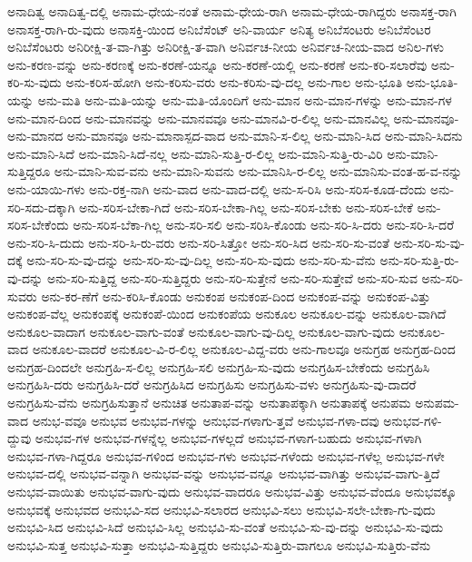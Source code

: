 {ಅನಾದಿತ್ವ
ಅನಾದಿತ್ವ-ದಲ್ಲಿ
ಅನಾಮ-ಧೇಯ-ನಂತೆ
ಅನಾಮ-ಧೇಯ-ರಾಗಿ
ಅನಾಮ-ಧೇಯ-ರಾಗಿದ್ದರು
ಅನಾಸಕ್ತ-ರಾಗಿ
ಅನಾಸಕ್ತ-ರಾಗಿ-ರು-ವುದು
ಅನಾಸಕ್ತಿ-ಯಿಂದ
ಅನಿಬೆಸೆಂಟ್
ಅನಿ-ವಾರ್ಯ
ಅನಿತ್ಯ
ಅನಿಬೆಸಂಟರು
ಅನಿಬೆಸೆಂಟರ
ಅನಿಬೆಸೆಂಟರು
ಅನಿರೀಕ್ಷಿ-ತ-ವಾ-ಗಿತ್ತು
ಅನಿರೀಕ್ಷಿ-ತ-ವಾಗಿ
ಅನಿರ್ವಚ-ನೀಯ
ಅನಿರ್ವಚ-ನೀಯ-ವಾದ
ಅನಿಲ-ಗಳು
ಅನು-ಕರಣ-ವನ್ನು
ಅನು-ಕರಣಕ್ಕೆ
ಅನು-ಕರಣೆ-ಯನ್ನೂ
ಅನು-ಕರಣೆ-ಯಲ್ಲಿ
ಅನು-ಕರಣೆ
ಅನು-ಕರಿ-ಸಲಾರೆವು
ಅನು-ಕರಿ-ಸು-ವುದು
ಅನು-ಕರಿಸ-ಹೋಗಿ
ಅನು-ಕರಿಸು-ವರು
ಅನು-ಕರಿಸು-ವು-ದಲ್ಲ
ಅನು-ಗಾಲ
ಅನು-ಭೂತಿ
ಅನು-ಭೂತಿ-ಯನ್ನು
ಅನು-ಮತಿ
ಅನು-ಮತಿ-ಯನ್ನು
ಅನು-ಮತಿ-ಯೊಂದಿಗೆ
ಅನು-ಮಾನ
ಅನು-ಮಾನ-ಗಳನ್ನು
ಅನು-ಮಾನ-ಗಳ
ಅನು-ಮಾನ-ದಿಂದ
ಅನು-ಮಾನವನ್ನು
ಅನು-ಮಾನವವೂ
ಅನು-ಮಾನವಿ-ರ-ಲಿಲ್ಲ
ಅನು-ಮಾನವಿಲ್ಲ
ಅನು-ಮಾನವೂ-
ಅನು-ಮಾನದ
ಅನು-ಮಾನವೂ
ಅನು-ಮಾನಾಸ್ಪದ-ವಾದ
ಅನು-ಮಾನಿ-ಸ-ಲಿಲ್ಲ
ಅನು-ಮಾನಿ-ಸಿದ
ಅನು-ಮಾನಿ-ಸಿದನು
ಅನು-ಮಾನಿ-ಸಿದೆ
ಅನು-ಮಾನಿ-ಸಿದೆ-ನಲ್ಲ
ಅನು-ಮಾನಿ-ಸುತ್ತಿ-ರ-ಲಿಲ್ಲ
ಅನು-ಮಾನಿ-ಸುತ್ತಿ-ರು-ವಿರಿ
ಅನು-ಮಾನಿ-ಸುತ್ತಿದ್ದರೂ
ಅನು-ಮಾನಿ-ಸುವ-ವನು
ಅನು-ಮಾನಿ-ಸುವನು
ಅನು-ಮಾನಿಸಿ-ರ-ಲಿಲ್ಲ
ಅನು-ಮಾನಿಸು-ವಂತ-ಹ-ವ-ನನ್ನು
ಅನು-ಯಾಯಿ-ಗಳು
ಅನು-ರಕ್ತ-ನಾಗಿ
ಅನು-ವಾದ
ಅನು-ವಾದ-ದಲ್ಲಿ
ಅನು-ಸ-ರಿಸಿ
ಅನು-ಸರಿಸ-ಕೂಡ-ದೆಂದು
ಅನು-ಸರಿ-ಸದು-ದಕ್ಕಾಗಿ
ಅನು-ಸರಿಸ-ಬೇಕಾ-ಗಿದೆ
ಅನು-ಸರಿಸ-ಬೇಕಾ-ಗಿಲ್ಲ
ಅನು-ಸರಿಸ-ಬೇಕು
ಅನು-ಸರಿಸ-ಬೇಕೆ
ಅನು-ಸರಿಸ-ಬೇಕೆಂದು
ಅನು-ಸರಿಸ-ಬೆಕಾ-ಗಿಲ್ಲ
ಅನು-ಸರಿ-ಸಲಿ
ಅನು-ಸರಿಸಿ-ಕೊಂಡು
ಅನು-ಸರಿ-ಸಿ-ದರು
ಅನು-ಸರಿ-ಸಿ-ದರೆ
ಅನು-ಸರಿ-ಸಿ-ದುದು
ಅನು-ಸರಿ-ಸಿ-ರು-ವರು
ಅನು-ಸರಿ-ಸಿತ್ತೋ
ಅನು-ಸರಿ-ಸಿದ
ಅನು-ಸರಿ-ಸು-ವಂತೆ
ಅನು-ಸರಿ-ಸು-ವು-ದಕ್ಕೆ
ಅನು-ಸರಿ-ಸು-ವು-ದನ್ನು
ಅನು-ಸರಿ-ಸು-ವು-ದಿಲ್ಲ
ಅನು-ಸರಿ-ಸು-ವುದು
ಅನು-ಸರಿ-ಸು-ವೆನು
ಅನು-ಸರಿ-ಸುತ್ತಿ-ರು-ವು-ದನ್ನು
ಅನು-ಸರಿ-ಸುತ್ತಿದ್ದ
ಅನು-ಸರಿ-ಸುತ್ತಿದ್ದರು
ಅನು-ಸರಿ-ಸುತ್ತೇನೆ
ಅನು-ಸರಿ-ಸುತ್ತೇವೆ
ಅನು-ಸರಿ-ಸುವ
ಅನು-ಸರಿ-ಸುವರು
ಅನು-ಕರ-ಣೆಗೆ
ಅನು-ಕರಿಸಿ-ಕೊಂಡು
ಅನುಕಂಪ
ಅನುಕಂಪ-ದಿಂದ
ಅನುಕಂಪ-ವನ್ನು
ಅನುಕಂಪ-ವಿತ್ತು
ಅನುಕಂಪ-ವೆಲ್ಲ
ಅನುಕಂಪಕ್ಕೆ
ಅನುಕಂಪೆ-ಯಿಂದ
ಅನುಕಂಪೆಯ
ಅನುಕೂಲ
ಅನುಕೂಲ-ವನ್ನು
ಅನುಕೂಲ-ವಾಗಿದೆ
ಅನುಕೂಲ-ವಾದಾಗ
ಅನುಕೂಲ-ವಾಗು-ವಂತೆ
ಅನುಕೂಲ-ವಾಗು-ವು-ದಿಲ್ಲ
ಅನುಕೂಲ-ವಾಗು-ವುದು
ಅನುಕೂಲ-ವಾದ
ಅನುಕೂಲ-ವಾದರೆ
ಅನುಕೂಲ-ವಿ-ರ-ಲಿಲ್ಲ
ಅನುಕೂಲ-ವಿದ್ದ-ವರು
ಅನು-ಗಾಲವೂ
ಅನುಗ್ರಹ
ಅನುಗ್ರಹ-ದಿಂದ
ಅನುಗ್ರಹ-ದಿಂದಲೇ
ಅನುಗ್ರಹಿ-ಸ-ಲಿಲ್ಲ
ಅನುಗ್ರಹಿ-ಸಲಿ
ಅನುಗ್ರಹಿ-ಸು-ವುದು
ಅನುಗ್ರಹಿಸ-ಬೇಕೆಂದು
ಅನುಗ್ರಹಿಸಿ
ಅನುಗ್ರಹಿಸಿ-ದರು
ಅನುಗ್ರಹಿಸಿ-ದರೆ
ಅನುಗ್ರಹಿಸಿದ
ಅನುಗ್ರಹಿಸು
ಅನುಗ್ರಹಿಸು-ವಳು
ಅನುಗ್ರಹಿಸು-ವು-ದಾದರೆ
ಅನುಗ್ರಹಿಸು-ವೆನು
ಅನುಗ್ರಹಿಸುತ್ತಾನೆ
ಅನುಚಿತ
ಅನುತಾಪ-ವನ್ನು
ಅನುತಾಪಕ್ಕಾಗಿ
ಅನುತಾಪಕ್ಕೆ
ಅನುಪಮ
ಅನುಪಮ-ವಾದ
ಅನುಭ-ವವೂ
ಅನುಭವ
ಅನುಭವ-ಗಳನ್ನು
ಅನುಭವ-ಗಳಾಗು-ತ್ತವೆ
ಅನುಭವ-ಗಳಾ-ದವು
ಅನುಭವ-ಗಳಿ-ದ್ದುವು
ಅನುಭವ-ಗಳ
ಅನುಭವ-ಗಳನ್ನೆಲ್ಲ
ಅನುಭವ-ಗಳಲ್ಲದೆ
ಅನುಭವ-ಗಳಾಗ-ಬಹುದು
ಅನುಭವ-ಗಳಾಗಿ
ಅನುಭವ-ಗಳಾ-ಗಿದ್ದರೂ
ಅನುಭವ-ಗಳಿಂದ
ಅನುಭವ-ಗಳು
ಅನುಭವ-ಗಳೆಂದು
ಅನುಭವ-ಗಳೆಲ್ಲ
ಅನುಭವ-ಗಳೇ
ಅನುಭವ-ದಲ್ಲಿ
ಅನುಭವ-ವನ್ನಾಗಿ
ಅನುಭವ-ವನ್ನು
ಅನುಭವ-ವನ್ನೂ
ಅನುಭವ-ವಾಗಿತ್ತು
ಅನುಭವ-ವಾಗು-ತ್ತಿದೆ
ಅನುಭವ-ವಾಯಿತು
ಅನುಭವ-ವಾಗು-ವುದು
ಅನುಭವ-ವಾದರೂ
ಅನುಭವ-ವಿತ್ತು
ಅನುಭವ-ವೆಂದೂ
ಅನುಭವಕ್ಕೂ
ಅನುಭವಕ್ಕೆ
ಅನುಭವದ
ಅನುಭವಿ-ಸದ
ಅನುಭವಿ-ಸಲಾರದ
ಅನುಭವಿ-ಸಲು
ಅನುಭವಿ-ಸಲೇ-ಬೇಕಾ-ಗು-ವುದು
ಅನುಭವಿ-ಸಿದ
ಅನುಭವಿ-ಸಿದೆ
ಅನುಭವಿ-ಸಿಲ್ಲ
ಅನುಭವಿ-ಸು-ವಂತೆ
ಅನುಭವಿ-ಸು-ವು-ದನ್ನು
ಅನುಭವಿ-ಸು-ವುದು
ಅನುಭವಿ-ಸುತ್ತ
ಅನುಭವಿ-ಸುತ್ತಾ
ಅನುಭವಿ-ಸುತ್ತಿದ್ದರು
ಅನುಭವಿ-ಸುತ್ತಿರು-ವಾಗಲೂ
ಅನುಭವಿ-ಸುತ್ತಿರು-ವೆನು
}
